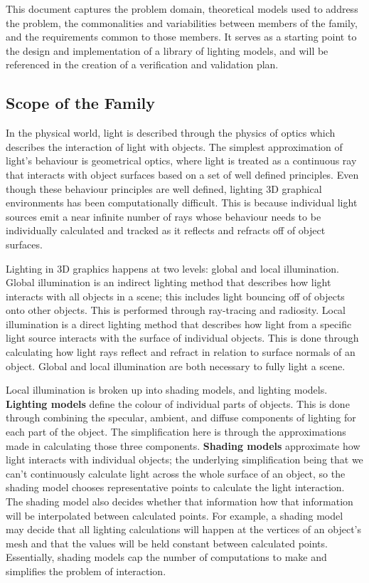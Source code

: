 \documentclass[12pt]{article}
\begin{document}
This document captures the problem domain, theoretical models used to address 
the problem, the commonalities and variabilities between members of the family, 
and the requirements common to those members. It serves as a starting point to 
the design and implementation of a library of lighting models, and will be 
referenced in the creation of a verification and validation plan.

\subsection{Scope of the Family} \label{sec_problem_definition}
In the physical world, light is described through the physics of optics which 
describes the interaction of light with objects. The simplest approximation of 
light's behaviour is geometrical optics, where light is treated as a continuous 
ray that interacts with object surfaces based on a set of well defined 
principles. Even though these behaviour principles are well defined, lighting 
3D graphical environments has been computationally difficult. This is because 
individual light sources emit a near infinite number of rays whose behaviour 
needs to be individually calculated and tracked as it reflects and refracts off 
of object surfaces.

Lighting in 3D graphics happens at two levels: global and local illumination.  
Global illumination is an indirect lighting method that describes how light 
interacts with all objects in a scene; this includes light bouncing off of 
objects onto other objects. This is performed through ray-tracing and 
radiosity. Local illumination is a direct lighting method that describes how 
light from a specific light source interacts with the surface of individual 
objects. This is done through calculating how light rays reflect and refract in 
relation to surface normals of an object. Global and local illumination are 
both necessary to fully light a scene.

Local illumination is broken up into shading models, and lighting models.  
\textbf{Lighting models} define the colour of individual parts of objects. This 
is done through combining the specular, ambient, and diffuse components of 
lighting for each part of the object. The simplification here is through the 
approximations made in calculating those three components. \textbf{Shading 
models} approximate how light interacts with individual objects; the underlying 
simplification being that we can't continuously calculate light across the 
whole surface of an object, so the shading model chooses representative points 
to calculate the light interaction. The shading model also decides whether that 
information how that information will be interpolated between calculated 
points. For example, a shading model may decide that all lighting calculations 
will happen at the vertices of an object's mesh and that the values will be 
held constant between calculated points. Essentially, shading models cap the 
number of computations to make and simplifies the problem of interaction.
\end{document}
